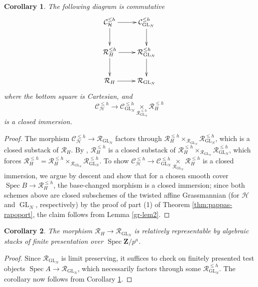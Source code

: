 \documentclass[11pt]{amsart}
\newtheorem{cor}{Corollary}
\numberwithin{thm}{section}
\numberwithin{lem}{section}
\numberwithin{cor}{section}
\numberwithin{prop}{section}
\numberwithin{exam}{section}
\numberwithin{dfn}{section}
\newcommand{\GL}{\operatorname{GL}}
\newcommand{\spec}{\operatorname{Spec}}
\newcommand{\cC}{\mathcal{C}}
\newcommand{\calR}{\mathcal{R}}
\newcommand{\clR}{\mathcal{R}}
\newcommand{\clH}{\mathcal{H}}
\newcommand{\Z}{\mathbf{Z}}
\begin{document}
\begin{cor}
\label{cor:cartesian-RG}
The following diagram is commutative
$$
\xymatrix{
    \cC_{\clH}^{\le h}\ar[d]\ar[r] & \cC_{\GL_N}^{\le h}\ar[d]\\
    \calR_{H}^{\le h}\ar[d]\ar[r] & \calR_{\GL_N}^{\le h}\ar[d]\\
    \calR_{H}\ar[r] & \calR_{\GL_N}
}
$$
where the bottom square is Cartesian,
and 
$$
\cC_{\clH}^{\le h} \to \cC_{\GL_N}^{\le h}\underset{\clR_{\GL_N}^{\le h}}{\times}\clR_{H}^{\le h}
$$
is a closed immersion.
\end{cor}

\begin{proof}
The morphism $\cC_{\clH}^{\le h}\to\calR_{\GL_N}$
factors through $\calR_{H}^{\le h}\times_{\calR_{\GL_N}}\calR_{\GL_N}^{\le h}$,
which is a closed substack of $\calR_{H}$.
By \cite[Lemma 3.2.31]{EG21},
$\calR_{H}^{\le h}$ is a closed substack of
$\calR_{H}^{\le h}\times_{\calR_{\GL_N}}\calR_{\GL_N}^{\le h}$,
which forces
$\calR_{H}^{\le h} = \calR_{H}^{\le h}\times_{\calR_{\GL_N}}\calR_{\GL_N}^{\le h}$.
To show
$\cC_{\clH}^{\le h} \to \cC_{\GL_N}^{\le h}\underset{\clR_{\GL_N}}{\times}\clR_{H}^{\le h}$
is a closed immersion,
we argue by descent and show that
for a chosen smooth cover $\spec B\to \clR_{H}^{\le h}$,
the base-changed morphism
is a closed immersion;
since both schemes above are closed subschemes of the twisted affine Grassmannian
(for $\clH$ and $\GL_N$, respectively) by the proof of
part (1) of Theorem \ref{thm:pappas-rapoport},
the claim follows from Lemma \ref{gr-lem2}.
%
\end{proof}

\begin{cor}
The morphism
$\clR_H\to \clR_{\GL_N}$
is relatively representable by
algebraic stacks of finite presentation
over $\spec \Z/p^a$.
\label{cor:finite}
\end{cor}

\begin{proof}
Since $\clR_{\GL_N}$
is limit preserving,
it suffices to check on finitely presented
test objects
$\spec A\to \clR_{\GL_N}$,
which necessarily factors through some
$\clR_{\GL_N}^{\le h}$.
The corollary now follows from Corollary \ref{cor:cartesian-RG}.
\end{proof}
\end{document}
